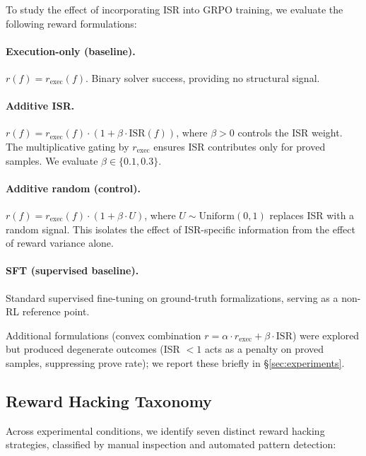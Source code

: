 To study the effect of incorporating ISR into GRPO training, we evaluate the following reward formulations:

\paragraph{Execution-only (baseline).} $r(f) = r_{\text{exec}}(f)$. Binary solver success, providing no structural signal.

\paragraph{Additive ISR.} $r(f) = r_{\text{exec}}(f) \cdot (1 + \beta \cdot \text{ISR}(f))$, where $\beta > 0$ controls the ISR weight. The multiplicative gating by $r_{\text{exec}}$ ensures ISR contributes only for proved samples. We evaluate $\beta \in \{0.1, 0.3\}$.

\paragraph{Additive random (control).} $r(f) = r_{\text{exec}}(f) \cdot (1 + \beta \cdot U)$, where $U \sim \text{Uniform}(0, 1)$ replaces ISR with a random signal. This isolates the effect of ISR-specific information from the effect of reward variance alone.

\paragraph{SFT (supervised baseline).} Standard supervised fine-tuning on ground-truth formalizations, serving as a non-RL reference point.

Additional formulations (convex combination $r = \alpha \cdot r_{\text{exec}} + \beta \cdot \text{ISR}$) were explored but produced degenerate outcomes (ISR $< 1$ acts as a penalty on proved samples, suppressing prove rate); we report these briefly in \S\ref{sec:experiments}.

\subsection{Reward Hacking Taxonomy}
\label{ssec:taxonomy}

Across experimental conditions, we identify seven distinct reward hacking strategies, classified by manual inspection and automated pattern detection:

